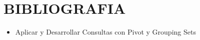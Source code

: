 \section{BIBLIOGRAFIA} 

\begin{itemize}
\item Aplicar y Desarrollar  Consultas con Pivot y Grouping Sets



\end{itemize}